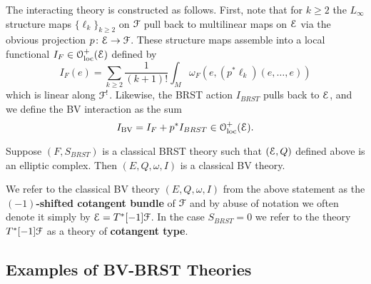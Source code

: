 \documentclass[10pt, oneside]{article}
\begin{document}
The interacting theory is constructed as follows. First, note that for $k \geq 2$ the $L_\infty$ structure maps $\{\ell_k\}_{k \geq 2}$ on $\mathcal F$ pull back to multilinear maps on $\mathcal E$ via the obvious projection $p\colon \mathcal E\rightarrow \mathcal F$. These structure maps assemble into a local functional $I_F \in \mathcal{O}_{\rm loc}^+(\mathcal E)$ defined by
\[
I_F (e) = \sum_{k \geq 2} \frac{1}{(k+1)!} \int_M \omega_F(e, (p^*\ell_k) (e, \ldots, e))
\] 
which is linear along $\mathcal F^!$. Likewise, the BRST action $I_{BRST}$ pulls back to $\mathcal E$, and we define the BV interaction as the sum
\[
I_{\mathrm{BV}} = I_{F} + p^* I_{BRST} \in \mathcal{O}_{\rm loc}^+(\mathcal E) .
\]

\begin{lemma}
Suppose $(F, S_{BRST})$ is a classical BRST theory such that $(\mathcal E, Q)$ defined above is an elliptic complex. Then $(E, Q, \omega, I)$ is a classical BV theory.
\end{lemma}

We refer to the classical BV theory $(E, Q, \omega, I)$ from the above statement as the {\bf $(-1)$-shifted cotangent bundle} of $\mathcal F$ and by abuse of notation we often denote it simply by $\mathcal E = T^*[-1] \mathcal F$. In the case $S_{BRST} = 0$ we refer to the theory $T^*[-1] \mathcal F$ as a theory of {\bf cotangent type}.

\subsection{Examples of BV-BRST Theories}

\begin{comment}
\brian{should we make these definitions, recollections, or just conventions?}

If $M$ is a smooth manifold, its {\em de Rham stack}, as a dg ringed space, is 
\[
M_{\rm dR} = \left(M , (\Omega^\bu_M, \d_{\rm dR})\right) .
\] 

If $X$ is a complex manifold, there are two naturally associated dg ringed spaces that will be important for us. 
The first is the $\dbar$-{\em stack}, defined by
\[
X_{\dbar} = \left(M , (\Omega^{0,\bu}_X, \dbar) \right) .
\]
The next is the {\em Dolbeault stack}, defined by
\[
X_{\rm Dol} = \left(M, (\Omega^{\bu,\bu}_X, \dbar)\right) .
\] 
Note that as sheaves of dg modules, there is a quasi-isomorphism $(\Omega^{p,*}_M, \dbar) = \Omega^{p, hol}_M$.
Thus, one can think of the underlying ring of the Dolbeault stack as functions on the shifted holomorphic tangent bundle $T^{1,0} [1] M$ of $M$.
\end{comment}
\end{document}
